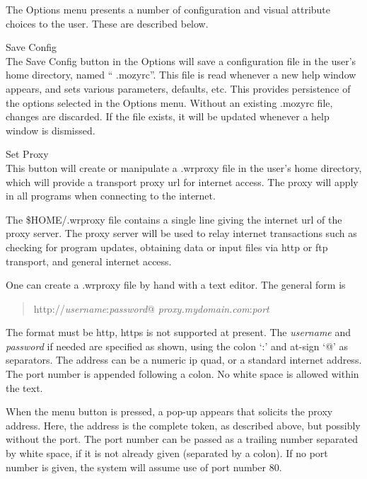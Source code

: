 The {\cb Options} menu presents a number of configuration and visual
attribute choices to the user.  These are described below.
\begin{description}

\item{\cb Save Config}\\
The {\cb Save Config} button in the {\cb Options} will save a
configuration file in the user's home directory, named ``{\vt
.mozyrc}''.  This file is read whenever a new help window appears, and
sets various parameters, defaults, etc.  This provides persistence of
the options selected in the {\cb Options} menu.  Without an existing
{\vt .mozyrc} file, changes are discarded.  If the file exists, it
will be updated whenever a help window is dismissed.

\item{\cb Set Proxy}\\
This button will create or manipulate a {\vt .wrproxy} file in the
user's home directory, which will provide a transport proxy url for
internet access.  The proxy will apply in all {\XicTools} programs
when connecting to the internet.

The {\vt \$HOME/.wrproxy} file contains a single line giving the
internet url of the proxy server.  The proxy server will be used to
relay internet transactions such as checking for program updates,
obtaining data or input files via http or ftp transport, and general
internet access.

One can create a {\vt .wrproxy} file by hand with a text editor.  The
general form is
\begin{quote}
{\vt http://}{\it username\/}{\vt :}{\it password\/}{\vt @}{\it
 proxy.mydomain.com\/}{\vt :}{\it port}
\end{quote}
The format must be {\vt http}, {\vt https} is not supported at
present.  The {\it username} and {\it password} if needed are
specified as shown, using the colon `{\vt :}' and at-sign `{\vt @}' as
separators.  The address can be a numeric ip quad, or a standard
internet address.  The port number is appended following a colon.  No
white space is allowed within the text.

When the menu button is pressed, a pop-up appears that solicits the
proxy address.  Here, the address is the complete token, as described
above, but possibly without the port.  The port number can be passed
as a trailing number separated by white space, if it is not already
given (separated by a colon).  If no port number is given, the system
will assume use of port number 80.


\end{description}
